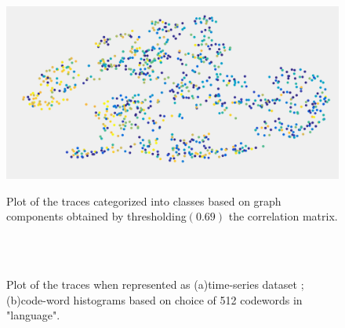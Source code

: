 \documentclass[10pt]{article}
\begin{document}
\begin{figure}[h!]
\centering
\includegraphics[scale=0.4]{cwHistogram_Components.png}\\
\caption{Plot of the traces categorized into classes based on graph components obtained by thresholding$(0.69)$ the correlation matrix.}
\label{fig:cwhist_specg_classes}
\end{figure}

\begin{figure}[h!]
\centering
{}\\
\\
\caption{Plot of the traces when represented as (a)time-series dataset ;(b)code-word histograms based on choice of 512 codewords in "language".}
\label{fig:cwhist_allTraces}
\end{figure}
\end{document}
